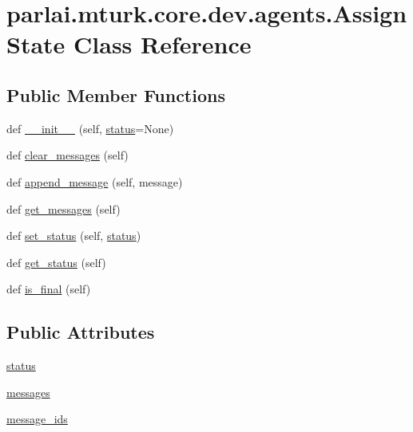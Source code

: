 \hypertarget{classparlai_1_1mturk_1_1core_1_1dev_1_1agents_1_1AssignState}{}\section{parlai.\+mturk.\+core.\+dev.\+agents.\+Assign\+State Class Reference}
\label{classparlai_1_1mturk_1_1core_1_1dev_1_1agents_1_1AssignState}
\subsection*{Public Member Functions}
\begin{DoxyCompactItemize}
\item 
def \hyperlink{classparlai_1_1mturk_1_1core_1_1dev_1_1agents_1_1AssignState_a9976e9b61eb5425255601bc99a10fdc7}{\+\_\+\+\_\+init\+\_\+\+\_\+} (self, \hyperlink{classparlai_1_1mturk_1_1core_1_1dev_1_1agents_1_1AssignState_a28eccfd2b979c7c1cf45a441ce614a16}{status}=None)
\item 
def \hyperlink{classparlai_1_1mturk_1_1core_1_1dev_1_1agents_1_1AssignState_af232f8d1724c7f525c0c489b80395299}{clear\+\_\+messages} (self)
\item 
def \hyperlink{classparlai_1_1mturk_1_1core_1_1dev_1_1agents_1_1AssignState_a56c2f2e29ac46d90afcc248a4ef1d508}{append\+\_\+message} (self, message)
\item 
def \hyperlink{classparlai_1_1mturk_1_1core_1_1dev_1_1agents_1_1AssignState_ac1b318dcae3eda8038a3ccaacdef4327}{get\+\_\+messages} (self)
\item 
def \hyperlink{classparlai_1_1mturk_1_1core_1_1dev_1_1agents_1_1AssignState_a8a4989ac979fca506d8249d3a749ca0c}{set\+\_\+status} (self, \hyperlink{classparlai_1_1mturk_1_1core_1_1dev_1_1agents_1_1AssignState_a28eccfd2b979c7c1cf45a441ce614a16}{status})
\item 
def \hyperlink{classparlai_1_1mturk_1_1core_1_1dev_1_1agents_1_1AssignState_a148aa78f43e6d050c29368b8c2aaf0a6}{get\+\_\+status} (self)
\item 
def \hyperlink{classparlai_1_1mturk_1_1core_1_1dev_1_1agents_1_1AssignState_a169e39dab458bde9c9ee494fc31fab00}{is\+\_\+final} (self)
\end{DoxyCompactItemize}
\subsection*{Public Attributes}
\begin{DoxyCompactItemize}
\item 
\hyperlink{classparlai_1_1mturk_1_1core_1_1dev_1_1agents_1_1AssignState_a28eccfd2b979c7c1cf45a441ce614a16}{status}
\item 
\hyperlink{classparlai_1_1mturk_1_1core_1_1dev_1_1agents_1_1AssignState_a95a4aae763453988405c9bf10977e35f}{messages}
\item 
\hyperlink{classparlai_1_1mturk_1_1core_1_1dev_1_1agents_1_1AssignState_ac261cbc1fe018a16b1b46365a86d48ed}{message\+\_\+ids}
\end{DoxyCompactItemize}
